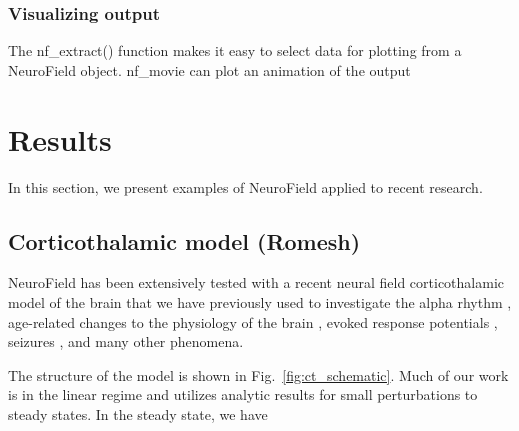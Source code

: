 \documentclass[preprint,review,10pt,authoryear,letterpaper]{elsarticle}
\begin{document}
\subsubsection{Visualizing output}
The nf\_extract() function makes it easy to select data for plotting from a NeuroField object.  
nf\_movie can plot an animation of the output

\clearpage

\section{Results}
\label{sec:results}

In this section, we present examples of NeuroField applied to recent research.

\subsection{Corticothalamic model (Romesh)}
\label{sec:ct}

NeuroField has been extensively tested with a recent neural field corticothalamic model of the brain \citep{Robinson2005,Rowe2004413,PhysRevE.63.021903,PhysRevE.65.041924,Robinson:04aa} that we have previously used to investigate the alpha rhythm \citep{PhysRevE.68.021922,PhysRevE.70.011911}, age-related changes to the physiology of the brain \citep{VanAlbada2010}, evoked response potentials \citep{Rennie2002,ker11}, seizures \citep{Breakspear2006}, and many other phenomena. 


The structure of the model is shown in Fig.~\ref{fig:ct_schematic}. Much of our work is in the linear regime and utilizes analytic results for small perturbations to steady states. In the steady state, we have
\end{document}
